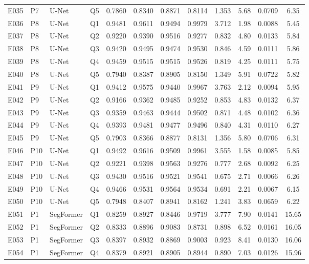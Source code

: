 \begin{longtable}{@{}lllllccccccc@{}}
E035 & P7 & U-Net & Q5 & 0.7860 & 0.8340 & 0.8871 & 0.8114 & 1.353 & 5.68 & 0.0709 & 6.35 \\
E036 & P8 & U-Net & Q1 & 0.9481 & 0.9611 & 0.9494 & 0.9979 & 3.712 & 1.98 & 0.0088 & 5.45 \\
E037 & P8 & U-Net & Q2 & 0.9220 & 0.9390 & 0.9516 & 0.9277 & 0.832 & 4.80 & 0.0133 & 5.84 \\
E038 & P8 & U-Net & Q3 & 0.9420 & 0.9495 & 0.9474 & 0.9530 & 0.846 & 4.59 & 0.0111 & 5.86 \\
E039 & P8 & U-Net & Q4 & 0.9459 & 0.9515 & 0.9515 & 0.9526 & 0.819 & 4.25 & 0.0111 & 5.75 \\
E040 & P8 & U-Net & Q5 & 0.7940 & 0.8387 & 0.8905 & 0.8150 & 1.349 & 5.91 & 0.0722 & 5.82 \\
E041 & P9 & U-Net & Q1 & 0.9412 & 0.9575 & 0.9440 & 0.9967 & 3.763 & 2.12 & 0.0094 & 5.95 \\
E042 & P9 & U-Net & Q2 & 0.9166 & 0.9362 & 0.9485 & 0.9252 & 0.853 & 4.83 & 0.0132 & 6.37 \\
E043 & P9 & U-Net & Q3 & 0.9359 & 0.9463 & 0.9444 & 0.9502 & 0.871 & 4.48 & 0.0102 & 6.36 \\
E044 & P9 & U-Net & Q4 & 0.9393 & 0.9481 & 0.9477 & 0.9496 & 0.840 & 4.31 & 0.0110 & 6.27 \\
E045 & P9 & U-Net & Q5 & 0.7903 & 0.8366 & 0.8877 & 0.8131 & 1.356 & 5.80 & 0.0706 & 6.31 \\
E046 & P10 & U-Net & Q1 & 0.9492 & 0.9616 & 0.9509 & 0.9961 & 3.555 & 1.58 & 0.0085 & 5.85 \\
E047 & P10 & U-Net & Q2 & 0.9221 & 0.9398 & 0.9563 & 0.9276 & 0.777 & 2.68 & 0.0092 & 6.25 \\
E048 & P10 & U-Net & Q3 & 0.9430 & 0.9516 & 0.9521 & 0.9541 & 0.675 & 2.71 & 0.0066 & 6.26 \\
E049 & P10 & U-Net & Q4 & 0.9466 & 0.9531 & 0.9564 & 0.9534 & 0.691 & 2.21 & 0.0067 & 6.15 \\
E050 & P10 & U-Net & Q5 & 0.7948 & 0.8407 & 0.8941 & 0.8162 & 1.241 & 3.83 & 0.0659 & 6.22 \\
E051 & P1 & SegFormer & Q1 & 0.8259 & 0.8927 & 0.8446 & 0.9719 & 3.777 & 7.90 & 0.0141 & 15.65 \\
E052 & P1 & SegFormer & Q2 & 0.8333 & 0.8896 & 0.9083 & 0.8731 & 0.898 & 6.52 & 0.0161 & 16.05 \\
E053 & P1 & SegFormer & Q3 & 0.8397 & 0.8932 & 0.8869 & 0.9003 & 0.923 & 8.41 & 0.0130 & 16.06 \\
E054 & P1 & SegFormer & Q4 & 0.8379 & 0.8921 & 0.8905 & 0.8944 & 0.890 & 7.03 & 0.0126 & 15.96 \\

\end{longtable}
